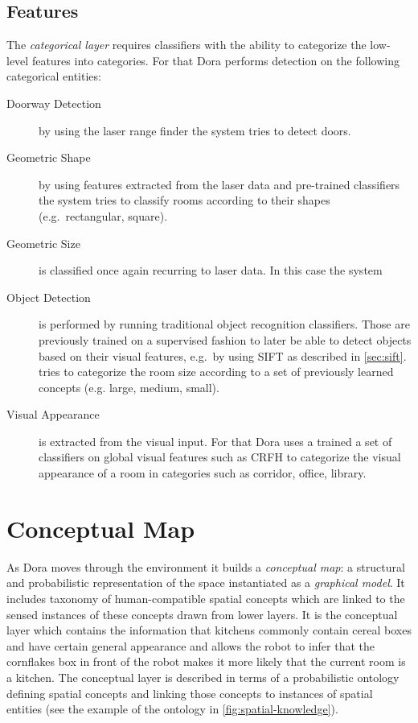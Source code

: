 \subsection{Features}
\label{sec:dora-features}
The \emph{categorical layer} requires classifiers with the ability to categorize the
low\hyp{}level features into categories.
For that \gls{Dora} performs detection on the following categorical entities:
\begin{description}
\item[Doorway Detection] by using the laser range finder the system tries to detect doors.
\item[Geometric Shape] by using features extracted from the laser data and pre-trained classifiers
the system tries to classify rooms according to their shapes (e.g.\ rectangular, square).
\item[Geometric Size] is classified once again recurring to laser data. In this case the system
\item[Object Detection] is performed by running traditional object recognition classifiers.
Those are previously trained on a supervised fashion to later be able to detect objects
based on their visual features, e.g.\ by using \gls{SIFT} as described in \autoref{sec:sift}.
tries to categorize the room size according to a set of previously learned concepts (e.g. large, medium, small).
\item[Visual Appearance] is extracted from the visual input. For that Dora uses a trained
a set of classifiers on global visual features such as \gls{CRFH} to categorize the visual
appearance of a room in categories such as corridor, office, library.
\end{description}

\section{Conceptual Map}
\label{sec:conceptual-map}
As \gls{Dora} moves through the environment it builds a \emph{conceptual map}: a structural and
probabilistic representation of the space instantiated as a \emph{graphical model}.
It includes taxonomy of human\hyp{}compatible spatial concepts which are linked to the sensed 
instances of these concepts drawn from lower layers. It is the conceptual layer which 
contains the information that kitchens commonly contain cereal boxes and have certain 
general appearance and allows the robot to infer that the cornflakes box in front of the 
robot makes it more likely that the current room is a kitchen. The conceptual layer is 
described in terms of a probabilistic ontology defining spatial concepts and linking 
those concepts to instances of spatial entities (see the example of the ontology in
\autoref{fig:spatial-knowledge}).

